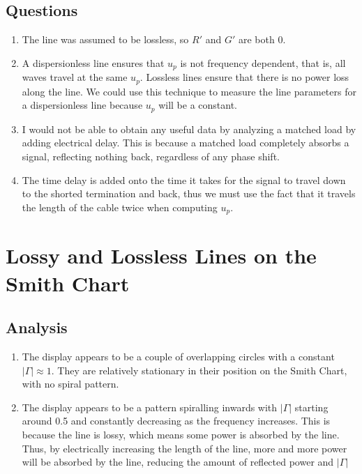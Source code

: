 \documentclass{article}
\begin{document}
\subsection{Questions}

\begin{enumerate}
	\item The line was assumed to be lossless, so $R'$ and $G'$ are both 0.
	\item A dispersionless line ensures that $u_p$ is not frequency dependent, that is, all waves travel at the same $u_p$. Lossless lines ensure that there is no power loss along the line. We could use this technique to measure the line parameters for a dispersionless line because $u_p$ will be a constant.
	\item I would not be able to obtain any useful data by analyzing a matched load by adding electrical delay. This is because a matched load completely absorbs a signal, reflecting nothing back, regardless of any phase shift.
	\item The time delay is added onto the time it takes for the signal to travel down to the shorted termination and back, thus we must use the fact that it travels the length of the cable twice when computing $u_p$.
\end{enumerate}


\section{Lossy and Lossless Lines on the Smith Chart}

\subsection{Analysis}
\begin{enumerate}
	\item The display appears to be a couple of overlapping circles with a constant $\vert\Gamma\vert\approx 1$. They are relatively stationary in their position on the Smith Chart, with no spiral pattern.
	\item The display appears to be a pattern spiralling inwards with $\vert\Gamma\vert$ starting around 0.5 and constantly decreasing as the frequency increases. This is because the line is lossy, which means some power is absorbed by the line. Thus, by electrically increasing the length of the line, more and more power will be absorbed by the line, reducing the amount of reflected power and $\vert\Gamma\vert$
\end{enumerate}
\end{document}
